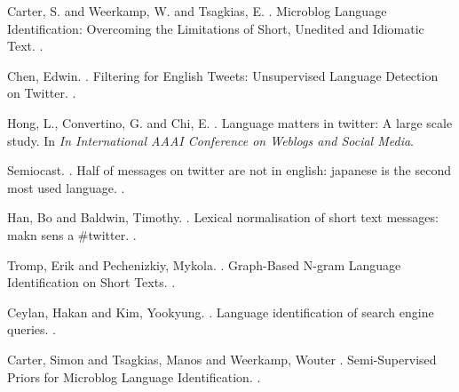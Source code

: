 \documentclass[11pt]{article}
\begin{document}
\begin{thebibliography}{}

Carter, S. and Weerkamp, W. and Tsagkias, E.
.
\newblock Microblog Language Identification: Overcoming the Limitations of Short, Unedited and Idiomatic Text.
.

Chen, Edwin.
.
\newblock Filtering for English Tweets: Unsupervised Language Detection on Twitter.
.

Hong, L., Convertino, G. and Chi, E.
.
\newblock Language matters in twitter: A large scale study.
\newblock In {\em In International AAAI Conference on Weblogs and Social Media}.

Semiocast.
.
\newblock Half of messages on twitter are not in english: japanese is the second most used language.
.


Han, Bo and Baldwin, Timothy.
.
\newblock Lexical normalisation of short text messages: makn sens a \#twitter.
.

Tromp, Erik and Pechenizkiy, Mykola.
.
\newblock Graph-Based N-gram Language Identification on Short Texts.
.

Ceylan, Hakan and Kim, Yookyung.
.
\newblock Language identification of search engine queries.
.

Carter, Simon and Tsagkias, Manos and Weerkamp, Wouter
.
\newblock Semi-Supervised Priors for Microblog Language Identification.
.


\end{thebibliography}
\end{document}
